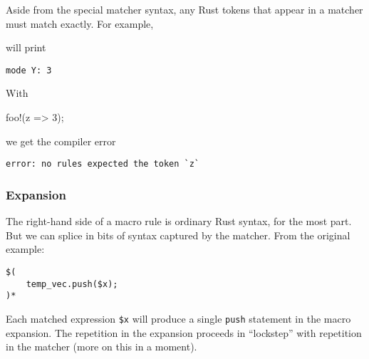 \documentclass[a4paper,]{book}
\newenvironment{Shaded}{\begin{snugshade}}{\end{snugshade}}
\newcommand{\KeywordTok}[1]{\textcolor[rgb]{0.13,0.29,0.53}{\textbf{{#1}}}}
\newcommand{\DecValTok}[1]{\textcolor[rgb]{0.00,0.00,0.81}{{#1}}}
\newcommand{\StringTok}[1]{\textcolor[rgb]{0.31,0.60,0.02}{{#1}}}
\newcommand{\OtherTok}[1]{\textcolor[rgb]{0.56,0.35,0.01}{{#1}}}
\newcommand{\NormalTok}[1]{{#1}}
\begin{document}
Aside from the special matcher syntax, any Rust tokens that appear in a
matcher must match exactly. For example,

\begin{Shaded}
\end{Shaded}

will print

\begin{verbatim}
mode Y: 3
\end{verbatim}

With

\begin{Shaded}
\begin{Highlighting}[]
\OtherTok{foo!}\NormalTok{(z => }\DecValTok{3}\NormalTok{);}
\end{Highlighting}
\end{Shaded}

we get the compiler error

\begin{verbatim}
error: no rules expected the token `z`
\end{verbatim}

\subsubsection{Expansion}\label{expansion}

The right-hand side of a macro rule is ordinary Rust syntax, for the
most part. But we can splice in bits of syntax captured by the matcher.
From the original example:

\begin{verbatim}
$(
    temp_vec.push($x);
)*
\end{verbatim}

Each matched expression \texttt{\$x} will produce a single \texttt{push}
statement in the macro expansion. The repetition in the expansion
proceeds in ``lockstep'' with repetition in the matcher (more on this in
a moment).
\end{document}

